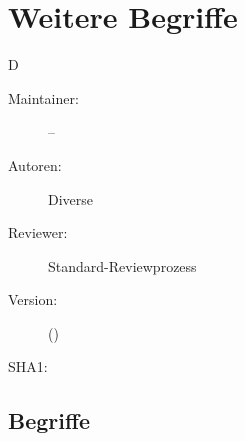 % 
\def\ChapterCode{WEI}
\chapter
[\CO{[WEI]} Weitere Begriffe]
{Weitere Begriffe}
\label{chp:WEI}

\ChapterIntro
{%
D
}
{%
\begin{description}
  \item[Maintainer:] --
  \item[Autoren:] Diverse
  \item[Reviewer:] Standard-Reviewprozess
  \item[Version:] {\DocVersion} ({\DocVersionInfo})
  \item[SHA1:] {\DocGitCommit}
\end{description}

{\TxTeilkapitelAASS}
}



\clearpage
\section{Begriffe}

\ChapterEnd